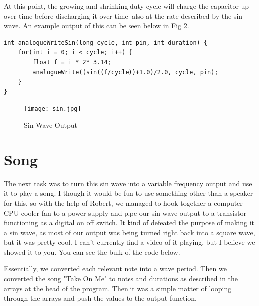\documentclass[prb,preprint]{revtex4-1}
\begin{document}
At this point, the growing and shrinking duty cycle will charge the capacitor up over time before discharging it over time, also at the rate described by the sin wave. An example output of this can be seen below in Fig 2.

\begin{verbatim}
int analogueWriteSin(long cycle, int pin, int duration) {
    for(int i = 0; i < cycle; i++) {
        float f = i * 2* 3.14;
        analogueWrite((sin((f/cycle))+1.0)/2.0, cycle, pin);
    }
}
\end{verbatim}

\begin{figure}[ht]
	\centering
	\texttt{[image: sin.jpg]}
	\caption{Sin Wave Output}
	\label{fig1}
\end{figure}

\section{Song}
The next task was to turn this sin wave into a variable frequency output and use it to play a song. I though it would be fun to use something other than a speaker for this, so with the help of Robert, we managed to hook together a computer CPU cooler fan to a power supply and pipe our sin wave output to a transistor functioning as a digital on off switch. It kind of defeated the purpose of making it a sin wave, as most of our output was being turned right back into a square wave, but it was pretty cool. I can't currently find a video of it playing, but I believe we showed it to you. You can see the bulk of the code below.

Essentially, we converted each relevant note into a wave period. Then we converted the song "Take On Me" to notes and durations as described in the arrays at the head of the program. Then it was a simple matter of looping through the arrays and push the values to the output function.
\end{document}
